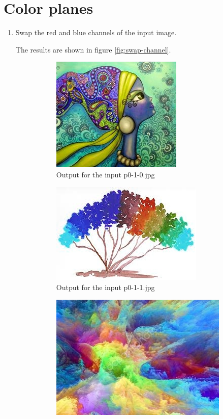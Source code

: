 \section{Color planes}
\begin{enumerate}[label=\emph{\alph*)}]
\item Swap the red and blue channels of the input image.

The results are shown in figure \ref{fig:swap-channel}.
\begin{figure}[h!]
\centering
\begin{subfigure}{0.5\textwidth}
  \centering
  \includegraphics[width=0.5\linewidth]{../output/p0-2-a-0.jpg}
  \caption{Output for the input p0-1-0.jpg}
  \label{fig:sfig1}
\end{subfigure}%
\begin{subfigure}{0.5\textwidth}
  \centering
  \includegraphics[width=0.5\linewidth]{../output/p0-2-a-1.jpg}
  \caption{Output for the input p0-1-1.jpg}
  \label{fig:sfig2}
\end{subfigure}
\begin{subfigure}{0.5\textwidth}
  \centering
  \includegraphics[width=0.5\linewidth]{../output/p0-2-a-2.jpg}

\end{subfigure}
\end{figure}
\end{enumerate}
